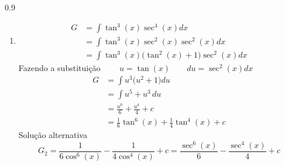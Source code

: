 \documentclass[a4paper,12pt,fleqn]{article}
\newenvironment{resposta}%
{\begingroup\color{blue}\small\begin{spacing}{0.9}}%
  {\end{spacing}\endgroup}
\begin{document}
\begin{resposta}
\begin{enumerate}[label=\alph*)]
    \item
    \begin{align*}
      G
      & = \int \tan^3(x)\sec^4(x) dx \\
      & = \int \tan^3(x)\sec^2(x) \sec^2(x) dx \\
      & = \int \tan^3(x) \big(\tan^2(x)+1\big) \sec^2(x) dx
    \end{align*}
    Fazendo a substituição
    \(
      \qquad
      u = \tan(x)
      \qquad
      du = \sec^2(x) dx
    \)
    \begin{align*}
      G
      & = \int u^3 \big(u^2+1\big) du \\
      & = \int u^5 + u^3 \,du \\
      & = \frac{u^6}{6} + \frac{u^4}{4} + c \\
      & = \frac{1}{6}\tan^6(x) + \frac{1}{4}\tan^4(x) + c
    \end{align*}
    Solução alternativa
    \[
      G_2
      = \frac{1}{6\cos^6(x)} - \frac{1}{4\cos^4(x)} + c
      = \frac{\sec^6(x)}{6} - \frac{\sec^4(x)}{4} + c
    \]



\end{enumerate}
\end{resposta}
\end{document}
